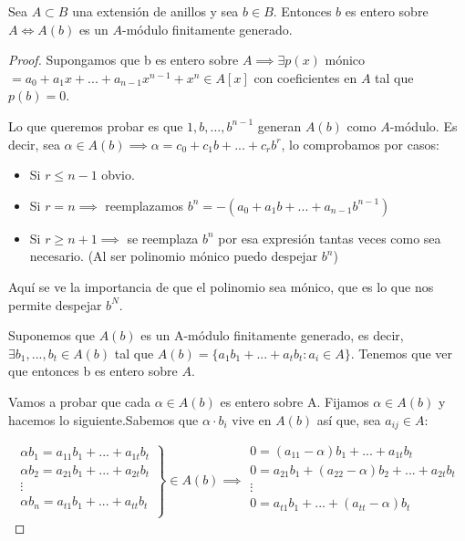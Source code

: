 \begin{prop}
	Sea $A\subset B$ una extensión de anillos y sea $b \in B$. Entonces $b$ es entero sobre $A \Leftrightarrow A(b)$ es un $A$-módulo finitamente generado.
\end{prop}

\begin{proof}

	\proofpart{$\implies$}

	Supongamos que b es entero sobre $A \implies \exists p(x)$ mónico $= a_0+a_1x+...+a_{n-1}x^{n-1}+x^n \in A[x]$ con coeficientes en $A$ tal que $p(b)=0$.

	Lo que queremos probar es que $1,b,...,b^{n-1}$ generan $A(b)$ como $A$-módulo. Es decir, sea $\alpha \in A(b) \implies \alpha=c_0+c_1b+...+c_rb^r$, lo comprobamos por casos:
	\begin{itemize}
		\item Si $r \leq n-1$ obvio.
		\item Si $r = n \implies$ reemplazamos $b^n=-(a_0+a_1b+...+a_{n-1}b^{n-1})$
		\item Si $r \geq n+1 \implies$ se reemplaza $b^n$ por esa expresión tantas veces como sea necesario. (Al ser polinomio mónico puedo despejar $b^n$)
	\end{itemize}

	Aquí se ve la importancia de que el polinomio sea mónico, que es lo que nos permite despejar $b^N$.

	\proofpart{$\Leftarrow$}

	Suponemos que $A(b)$ es un A-módulo finitamente generado, es decir, $\exists b_1,...,b_t \in A(b)$ tal que $A(b)=\{ a_1b_1+...+a_tb_t: a_i \in A \}$. Tenemos que ver que entonces b es entero sobre $A$.

	Vamos a probar que cada $\alpha \in A(b)$ es entero sobre A. Fijamos $\alpha \in A(b)$ y hacemos lo siguiente.Sabemos que $\alpha\cdot b_i$ vive en $A(b)$ así que,  sea $a_{ij}\in A$:

	\[
	\left. \begin{array}{c}
	\alpha b_1=a_{11}b_1+...+a_{1t}b_t \\
	\alpha b_2=a_{21}b_1+...+a_{2t}b_t \\
	\vdots \\
	\alpha b_n=a_{t1}b_1+...+a_{tt}b_t \\
	\end{array}
	\right\} \in A(b) \implies
	\begin{array}{c}
	0=(a_{11}-\alpha)b_1+...+a_{1t}b_t \\
	0=a_{21}b_1+(a_{22}-\alpha)b_2+...+a_{2t}b_t \\
	\vdots \\
	0=a_{t1}b_1+...+(a_{tt}-\alpha)b_t \\
	\end{array}
	\]


\end{proof}
